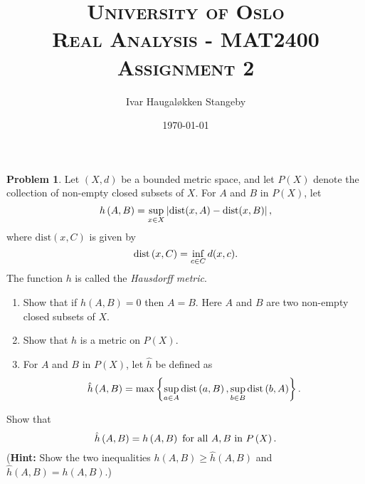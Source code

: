 \documentclass[a4paper]{article}
\title{
  \textsc{University of Oslo}\\
  \textsc{Real Analysis - MAT2400}\\
  \textsc{Assignment 2}\\
}
\author{Ivar Haugaløkken Stangeby}
\date{\today}
\theoremstyle{definition}
\newtheorem{prb}{Problem}
\newcommand{\dist}{\text{dist}}
\begin{document}
\maketitle

\begin{prb}
  Let $\left( X, d \right)$ be a bounded metric space, and let $P\left( X \right)$ denote the
  collection of non-empty closed subsets of $X$. For $A$ and $B$ in $P\left( X \right)$, let
  \begin{equation}
    \notag
    h\left( A, B \right) = \sup_{x\in X} \left| \dist(x, A) - \dist(x, B) \right|,
  \end{equation}
  where $\dist(x, C)$ is given by
  \begin{equation}
    \notag
    \dist\left( x, C \right) = \inf_{c\in C}d(x, c).
  \end{equation}
  The function $h$ is called the \textit{Hausdorff metric}.
  \begin{enumerate}
    \item Show that if $h(A, B) = 0$ then $A = B$. Here $A$ and $B$ are two non-empty closed subsets of $X$.
    \item Show that $h$ is a metric on $P\left( X \right)$.
    \item For $A$ and $B$ in $P\left( X \right)$, let $\hat{h}$ be defined as
      \begin{equation}
        \notag
        \hat{h}\left( A, B \right) = \max \left\{ \sup_{a \in A}\dist\left( a, B \right), \sup_{b\in B}\dist\left( b, A\right) \right\}.
      \end{equation}
  \end{enumerate}
  Show that
  \begin{equation}
    \notag
    \hat{h}\left( A,B \right) = h\left( A, B \right) \text{ for all } A, B \text{ in } P\left( X \right).
  \end{equation}
  (\textbf{Hint:} Show the two inequalities $h\left( A, B \right) \geq \hat{h}\left( A, B \right)$ and $\hat{h}\left( A, B \right) = h\left( A, B \right)$.) 
\end{prb}
\end{document}
